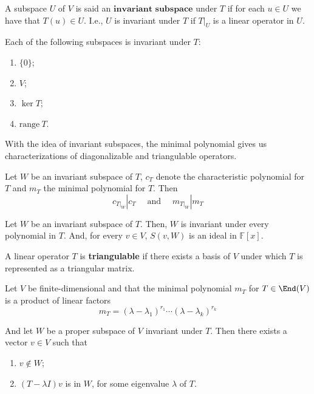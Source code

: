 \begin{definition}
	A subspace $U$ of $V$ is said an $\textbf{invariant subspace}$ under $T$ if for each $u \in U$ we have that $T(u) \in U$. I.e., $U$ is invariant under $T$ if $T|_U$ is a linear operator in $U$.
\end{definition}

\begin{example}
	Each of the following subspaces is invariant under $T$:
	\begin{enumerate}
		\item $\{ 0 \}$;
		\item $V$;
		\item $\ker T$;
		\item $\text{range}~T$.
	\end{enumerate}
\end{example}

With the idea of invariant subspaces, the minimal polynomial gives us characterizations of diagonalizable and triangulable operators.

\begin{lemma}
	Let $W$ be an invariant subspace of $T$, $c_T$ denote the characteristic polynomial for $T$ and $m_T$ the minimal polynomial for $T$. Then
	\[
		c_{T|_{W}} | c_T \quad \text{ and } \quad m_{T|_{W}} | m_T
	\]
\end{lemma}


\begin{lemma}
	Let $W$ be an invariant subspace of $T$. Then, $W$ is invariant under every polynomial in $T$. And, for every $v \in V$, $S(v, W)$ is an ideal in $\mathbb{F}[x]$.
\end{lemma}

\begin{definition}[Triangulable]
	A linear operator $T$ is \textbf{triangulable} if there exists a basis of $V$ under which $T$ is represented as a triangular matrix.
\end{definition}

\begin{lemma}
	Let $V$ be finite-dimensional and that the minimal polynomial $m_T$ for $T \in \End(V)$ is a product of linear factors 
	\[
		m_T = (\lambda - \lambda_1)^{r_1} \cdots (\lambda - \lambda_k)^{r_k}
	\]

	And let $W$ be a proper subspace of $V$ invariant under $T$. Then there exists a vector $v \in V$ such that
	\begin{enumerate}
		\item $v \notin W$;
		\item $(T - \lambda I) v$ is in $W$, for some eigenvalue $\lambda$ of $T$.
	\end{enumerate}
\end{lemma}

